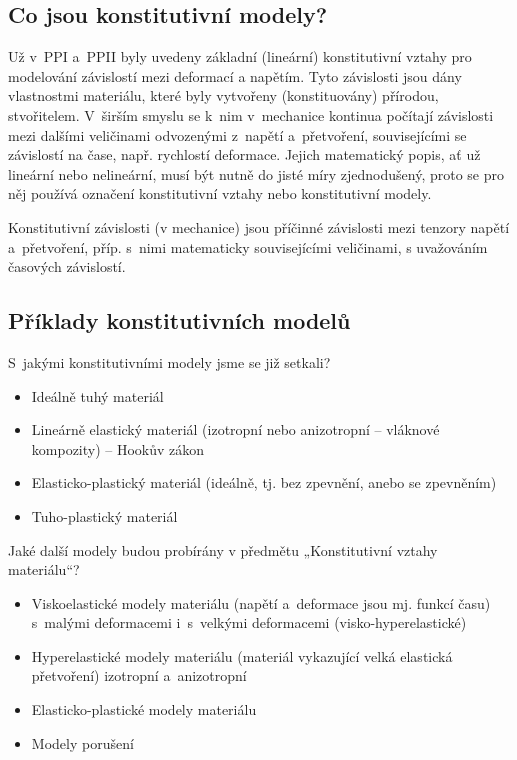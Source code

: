 
\subsection{Co jsou konstitutivní modely?}
Už v~PPI a~PPII byly uvedeny základní (lineární) konstitutivní vztahy pro modelování závislostí mezi deformací a napětím.
Tyto závislosti jsou dány vlastnostmi materiálu, které byly vytvořeny (konstituovány) přírodou, stvořitelem.
V~širším smyslu se k~nim v~mechanice kontinua počítají závislosti mezi dalšími veličinami odvozenými z~napětí a~přetvoření, souvisejícími se závislostí na čase, např. rychlostí deformace.
Jejich matematický popis, ať už lineární nebo nelineární, musí být nutně do jisté míry zjednodušený, proto se pro něj používá označení konstitutivní vztahy nebo konstitutivní modely.


Konstitutivní závislosti (v mechanice) jsou příčinné závislosti mezi tenzory napětí a~přetvoření, příp. s~nimi matematicky souvisejícími veličinami, s uvažováním časových závislostí.

\subsection{Příklady konstitutivních modelů}

S~jakými konstitutivními modely jsme se již setkali? 
\begin{itemize}
	\item Ideálně tuhý materiál
	\item Lineárně elastický materiál (izotropní nebo anizotropní -- vláknové kompozity) -- Hookův zákon
	\item Elasticko-plastický materiál (ideálně, tj. bez zpevnění, anebo se zpevněním)
	\item Tuho-plastický materiál
\end{itemize}

Jaké další modely budou probírány v předmětu „Konstitutivní vztahy materiálu“?
\begin{itemize}
	\item Viskoelastické modely materiálu (napětí a~deformace jsou mj. funkcí času) s~malými deformacemi i~s~velkými deformacemi (visko-hyperelastické)
	\item Hyperelastické modely materiálu  (materiál vykazující velká elastická přetvoření) izotropní a~anizotropní
	\item Elasticko-plastické modely materiálu
	\item Modely porušení
\end{itemize}

